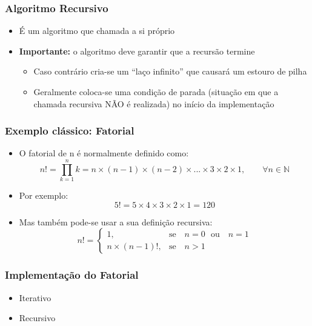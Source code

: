 \documentclass[aspectratio=169]{beamer}
\begin{document}
\begin{frame}\frametitle{Algoritmo Recursivo}
\begin{itemize}
	\item É um algoritmo que chamada a si próprio
	\item \textbf{Importante:} o algoritmo deve garantir que a recursão termine
	\begin{itemize}
		\item Caso contrário cria-se um ``laço infinito'' que causará um estouro de pilha
		
		\item Geralmente coloca-se uma condição de parada (situação em que a chamada recursiva NÃO é realizada) no início da implementação
	\end{itemize}
\end{itemize}
\end{frame}

\begin{frame}\frametitle{Exemplo clássico: Fatorial}
\begin{itemize}
	\item O fatorial de n é normalmente definido como:
\[ n! = \prod_{k=1}^{n}{k} = n \times (n-1) \times (n-2) \times ... \times 3 \times 2 \times 1,\qquad \forall n \in \mathbb{N}\]
	\item Por exemplo:
\[5 ! = 5 \times 4 \times 3 \times 2 \times 1 = 120\]
	\item Mas também pode-se usar a sua definição recursiva:
\[ n! = \begin{cases}
1, & \mbox{se ~ } n=0 \mbox{~ ou ~ } n=1\\
n \times (n-1)!, & \mbox{se ~ } n > 1
\end{cases} \]
\end{itemize}
\end{frame}

\begin{frame}[fragile]\frametitle{Implementação do Fatorial}
\begin{itemize}
	\item Iterativo
{\scriptsize}
	\item Recursivo
{\scriptsize}
\end{itemize}
\end{frame}
\end{document}
